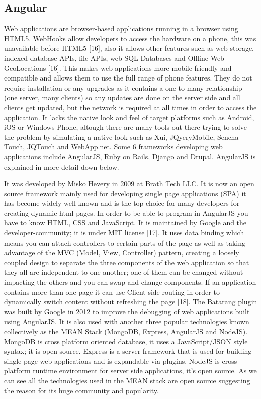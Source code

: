 \subsection{Angular}
\bigbreak
Web applications are browser-based applications running in a browser
using HTML5. WebHooks allow developers to access the hardware on a
phone, this was unavailable before HTML5 [16], also it allows other features
such as web storage, indexed database APIs, file APIs, web SQL Databases and
Offline Web GeoLocations [16]. This makes web applications more mobile
friendly and compatible and allows them to use the full range of phone
features. They do not require installation or any upgrades as it contains a one
to many relationship (one server, many clients) so any updates are done on
the server side and all clients get updated, but the network is required at all
times in order to access the application. It lacks the native look and feel of
target platforms such as Android, iOS or Windows Phone, altough there are
many tools out there trying to solve the problem by simulating a native look
such as Xui, JQyeryMobile, Sencha Touch, JQTouch and WebApp.net. Some
6
frameworks developing web applications include AngularJS, Ruby on Rails,
Django and Drupal. AngularJS is explained in more detail down below.

It was developed by Misko Hevery in 2009 at Brath Tech LLC. It is now an
open source framework mainly used for developing single page applications
(SPA) it has become widely well known and is the top choice for many
developers for creating dynamic html pages. In order to be able to program
in AngularJS you have to know HTML, CSS and JavaScript. It is maintained by
Google and the developer-community; it is under MIT license [17]. It uses
data binding which means you can attach controllers to certain parts of the
page as well as taking advantage of the MVC (Model, View, Controller)
pattern, creating a loosely coupled design to separate the three components
of the web application so that they all are independent to one another; one of
them can be changed without impacting the others and you can swap and
change components. If an application contains more than one page it can use
Client side routing in order to dynamically switch content without refreshing
the page [18]. The Batarang plugin was built by Google in 2012 to improve
the debugging of web applications built using AngularJS. It is also used with
another three popular technologies known collectively as the MEAN Stack
(MongoDB, Express, AngularJS and NodeJS). MongoDB is cross platform
oriented database, it uses a JavaScript/JSON style syntax; it is open source.
Express is a server framework that is used for building single page web
applications and is expandable via plugins. NodeJS is cross platform runtime
environment for server side applications, it’s open source. As we can see all
the technologies used in the MEAN stack are open source suggesting the
reason for its huge community and popularity.

